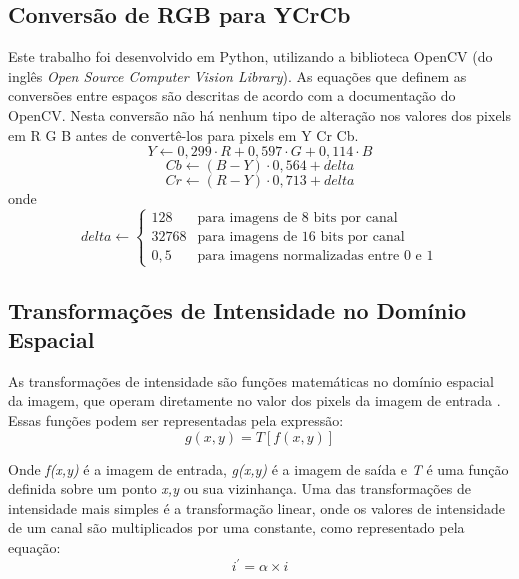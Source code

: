 \subsection{Conversão de RGB para YCrCb}
Este trabalho foi desenvolvido em Python, utilizando a biblioteca OpenCV (do inglês \textit{Open Source Computer Vision Library}). As equações que definem as conversões entre espaços são descritas de acordo com a documentação do OpenCV\cite{cvcolorconversion}.
Nesta conversão não há nenhum tipo de alteração nos valores dos pixels em R G B antes de convertê-los para pixels em Y Cr Cb.
\begin{equation}
    \label{eqn:ycrcb_y}
    Y \xleftarrow{} 0,299\cdot R + 0,597\cdot G + 0,114\cdot B
\end{equation}
\begin{equation}
    \label{eqn:ycrcb_cb}
    Cb \xleftarrow{} (B-Y)\cdot 0,564 + delta
\end{equation}
\begin{equation}
    \label{eqn:ycrcb_cr}
    Cr \xleftarrow{} (R-Y)\cdot 0,713 + delta
\end{equation}
onde
\begin{equation}
    \label{eqn:ycrcb_delta}
    delta \xleftarrow{}
    \begin{cases}
    128 & \text{para imagens de 8 bits por canal}\\
    32768 & \text{para imagens de 16 bits por canal}\\
    0,5 & \text{para imagens normalizadas entre 0 e 1}
    \end{cases}
\end{equation}

\subsection{Transformações de Intensidade no Domínio Espacial}

As transformações de intensidade são funções matemáticas no domínio espacial da imagem, que operam diretamente no valor dos pixels da imagem de entrada \cite{gonzalez}.
Essas funções podem ser representadas pela expressão:
\begin{equation}
    \label{eqn:intensitytransformation}
    g(x,y) = T\left [ f(x,y) \right ]
\end{equation}

Onde \textit{f(x,y)} é a imagem de entrada, \textit{g(x,y)} é a imagem de saída e \textit{T} é uma função definida sobre um ponto \textit{x,y} ou sua vizinhança.
Uma das transformações de intensidade mais simples é a transformação linear, onde os valores de intensidade de um canal são multiplicados por uma constante, como representado pela equação:
\begin{equation}
    \label{eqn:linearintensitytransformation}
    i^{'} = \alpha \times i
\end{equation}

